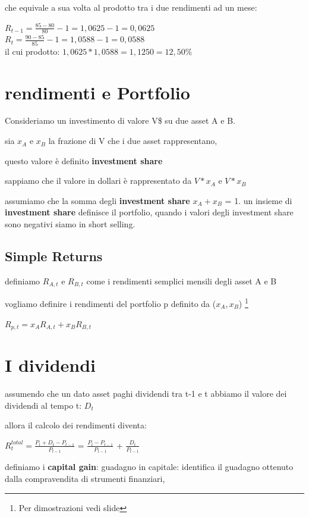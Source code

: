 \documentclass[a4paper,11pt]{report}
\begin{document}
{	che equivale a sua volta al prodotto tra i due rendimenti ad un mese:
	\begin{center}
	$R_{t-1}= {\frac {85-80}{80}} - 1 =1,0625-1= 0,0625 $\\
	$R_t = {\frac {90-85}{85}} - 1 =1,0588-1= 0,0588 $ \\
	 il cui prodotto:  $1,0625*1,0588=1,1250 = 12,50\% $ 
	\end{center}
\section{rendimenti e Portfolio}
	Consideriamo un investimento di valore V\$ su due asset A e B.

	sia $x_A$ e $x_B$ la frazione di V che i due asset rappresentano,

	questo valore è definito \textbf{investment share}

	sappiamo che il valore in dollari è rappresentato da $V*x_A$ e $V*x_B$

	assumiamo che la somma degli \textbf{investment share} $x_A + x_B$ = 1. \newline
	un insieme di \textbf{investment share} definisce il portfolio,
	quando i valori degli investment share sono negativi siamo in short selling.
\subsection{Simple Returns}
	definiamo $R_{A,t}$ e $R_{B,t}$ come i rendimenti semplici mensili degli asset A e B

	vogliamo definire i rendimenti del portfolio p definito da ($x_A,x_B$) \footnote{Per dimostrazioni vedi slide}

\begin{center}
	$R_{p,t} = x_A R_{A,t} + x_B R_{B,t}$
\end{center}
\section{I dividendi}
	assumendo che un dato asset paghi dividendi tra t-1 e t  abbiamo il valore dei dividendi al tempo t: $D_t$
	
	allora il calcolo dei rendimenti diventa:

\begin{center}
	$R_t^{total} = {\frac{P_t + D_t - P_{t-1}}{P_{t-1}}}$ = ${\frac {P_t - P_{t-1}}{P_{t-1}}}$
	 + ${\frac {D_t}{P_{t-1}}}$
\end{center}
 	definiamo i \textbf{capital gain}: guadagno in capitale: identifica il guadagno ottenuto dalla compravendita di strumenti finanziari,

}
\end{document}
